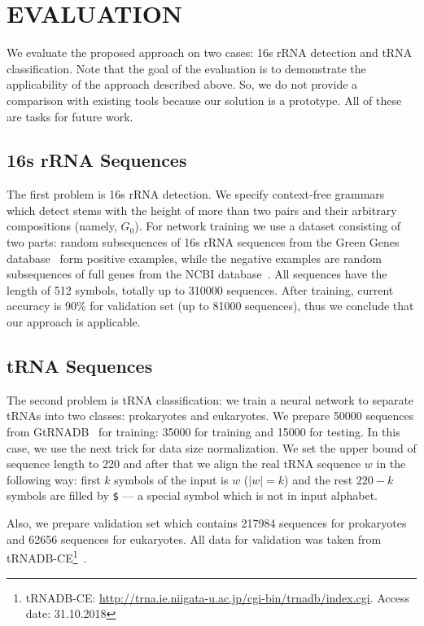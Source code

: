 \documentclass[a4paper,twoside]{article}
\begin{document}
\section{\uppercase{Evaluation}}
\label{sec:evaluation}

\noindent We evaluate the proposed approach on two cases: 16s rRNA detection and tRNA classification.
Note that the goal of the evaluation is to demonstrate the applicability of the approach described above.
So, we do not provide a comparison with existing tools because our solution is a prototype.
All of these are tasks for future work.

\subsection{16s rRNA Sequences}
\noindent The first problem is 16s rRNA detection.
We specify context-free grammars which detect stems with the height of more than two pairs and their arbitrary compositions (namely, $G_0$).
For network training we use a dataset consisting of two parts: random subsequences of 16s rRNA sequences from the Green Genes database~\cite{pmid16820507} form positive examples, while the negative examples are random subsequences of full genes from the NCBI database~\cite{pmid19854944}.
All sequences have the length of 512 symbols, totally up to 310000 sequences.
After training, current accuracy is 90\% for validation set (up to 81000 sequences), thus we conclude that our approach is applicable.

\subsection{tRNA Sequences}

\noindent The second problem is tRNA classification: we train a neural network to separate tRNAs into two classes: prokaryotes and eukaryotes.
We prepare 50000 sequences from GtRNADB~\cite{Chan2009} for training: 35000 for training and 15000 for testing.
In this case, we use the next trick for data size normalization.
We set the upper bound of sequence length to 220 and after that we align the real tRNA sequence $w$ in the following way: first $k$ symbols of the input is $w$ ($|w|=k$) and the rest $220-k$ symbols are filled by \verb|$| --- a special symbol which is not in input alphabet.

Also, we prepare validation set which contains 217984 sequences for prokaryotes and 62656 sequences for eukaryotes.
All data for validation was taken from tRNADB-CE\footnote{tRNADB-CE: \url{http://trna.ie.niigata-u.ac.jp/cgi-bin/trnadb/index.cgi}. Access date: 31.10.2018}~\cite{Abe2010}.
\end{document}
